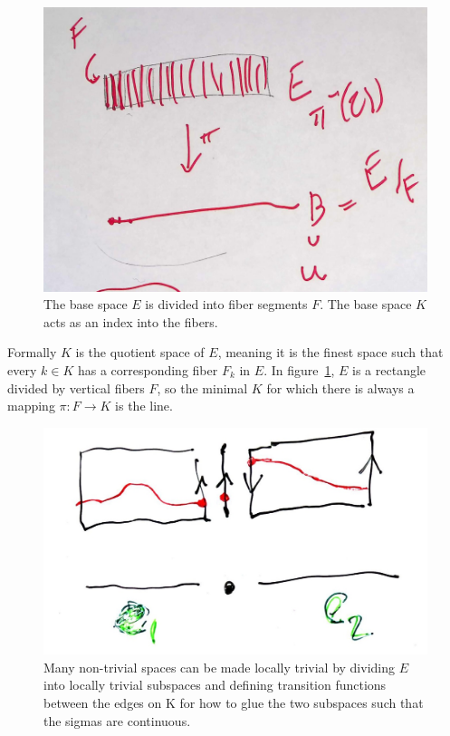 \documentclass[../main.tex]{subfiles}
\begin{document}
\begin{figure}[ht!]
    \label{fig:base_space_div}
    \includegraphics[width=.5\linewidth]{figures/math/k_qspace.png}
    \caption{ The base space $E$ is divided into fiber segments $F$. The base space $K$ acts as an index into the fibers.}
\end{figure}

Formally $K$ is the quotient space \cite{QuotientSpaceTopology2020} of $E$, meaning it is the finest space such that every $k \in K$ has a corresponding fiber $F_k$ in $E$. In figure~\ref{fig:base_space_div}, $E$ is a rectangle divided by vertical fibers $F$, so the minimal $K$ for which there is always a mapping $\pi: F\rightarrow K$ is the line. 

\begin{figure}
    \label{fig:data_base_transition}
    \includegraphics[width=\textwidth]{figures/math/transition_functions.png}
    \caption{Many non-trivial spaces can be made locally trivial by dividing $E$ into locally trivial subspaces and defining transition functions between the edges on K for how to glue the two subspaces such that the sigmas are continuous.}
\end{figure}
\end{document}
